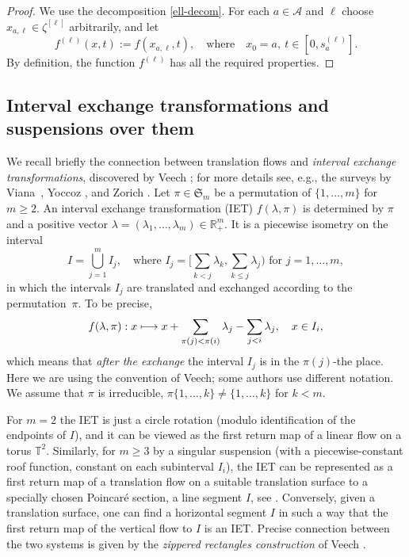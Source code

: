 \documentclass[10pt]{amsart}
\let\mathcal\mathscr
\def\mto{\mathchoice{\longmapsto}{\mapsto}{\mapsto}{\mapsto}}
\newcommand{\sep}{:}
\theoremstyle{plain}
\theoremstyle{definition}
\let\lam\lambda
\newcommand\Frs{\mathfrak{S}}
\newcommand\Ak{\mathcal{A}}
\newcommand{\R}{\mathbb{R}}
\newcommand\T{\mathbb{T}}
\begin{document}
\begin{proof}
We use the decomposition \eqref{ell-decom}. For each $a\in \Ak$ and $\ell$ choose $x_{a,\ell}\in \zeta^{[\ell]}$ arbitrarily, and let
\[
f^{(\ell)}(x,t):= f(x_{a,\ell},t),\quad \text{where}\quad x_0=a,\ t\in [0, s_a^{(\ell)}].
\]
By definition, the function $f^{(\ell)}$ has all the required properties.
\end{proof}

\subsection{Interval exchange transformations and suspensions over them} \label{subsec-IET}

We recall briefly the connection between translation flows and \emph{interval exchange transformations}, discovered by Veech \cite{Veech0,
veech}; for more details see, e.g., the surveys by Viana~\cite{viana2}, Yoccoz \cite{yoccoz}, and Zorich \cite{Zorich1}. Let $\pi\in \Frs_m$ be a permutation of $\{1,\ldots,m\}$ for $m\ge 2$.
An interval exchange transformation (IET) $f(\lam,\pi)$ is determined by $\pi$ and a positive vector $\lam = (\lam_1,\ldots,\lam_m)\in \R^m_+$. It is a piecewise isometry on the interval
\[
I = \bigcup_{j=1}^m I_j,\quad \text{where }I_j = \textstyle\bigl[\sum_{k<j}\lam_k, \sum_{k\le j} \lam_j\bigr)\text{ for }j=1,\ldots,m,
\]
in which the intervals $I_j$ are translated and exchanged according to the permutation~$\pi$.
To be precise,
\[
f(\lam,\pi)\sep x\mto x + \sum_{\pi(j) < \pi(i)} \lam_j - \sum_{j < i} \lam_j,\quad x\in I_i,
\]
which means that \emph{after the exchange} the interval $I_j$ is in the $\pi(j)$-the place. Here we are using the convention of Veech; some authors use different notation.
We assume that $\pi$ is irreducible, \ie $\pi\{1,\ldots,k\}\ne \{1,\ldots,k\}$ for $k<m$.

For $m=2$ the IET is just a circle rotation (modulo identification of the endpoints of $I$), and it can be viewed as the first return map of a linear flow on a torus $\T^2$. Similarly, for $m\ge 3$ by a singular suspension (with a piecewise-constant roof function, constant on each subinterval $I_i$), the IET can be represented as a first return map of a translation flow on a suitable translation surface to a specially chosen Poincaré section, a line segment $I$, see \cite{Veech0,veech}. Conversely,
given a translation surface, one can find a horizontal segment $I$ in such a way that the first return map of the vertical flow to $I$ is an IET. Precise connection between the two systems is given by the \emph{zippered rectangles construction} of Veech \cite{veech}.
\end{document}
